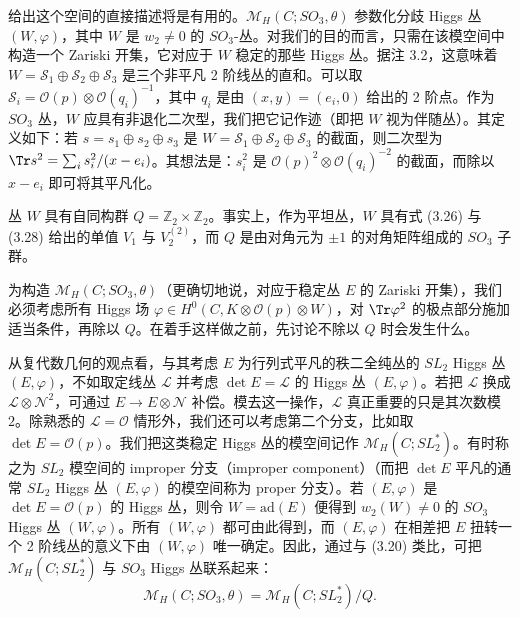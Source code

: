 给出这个空间的直接描述将是有用的。$\mathcal{M}_H(C;SO_3,\theta)$ 参数化分歧 Higgs 丛 $(W,\varphi)$，其中 $W$ 是 $w_2\ne0$ 的 $SO_3$-丛。对我们的目的而言，只需在该模空间中构造一个 Zariski 开集，它对应于 $W$ 稳定的那些 Higgs 丛。据注 3.2，这意味着 $W=\mathcal{S}_1\oplus\mathcal{S}_2\oplus\mathcal{S}_3$ 是三个非平凡 2 阶线丛的直和。可以取 $\mathcal{S}_i=\mathcal{O}(p)\otimes\mathcal{O}(q_i)^{-1}$，其中 $q_i$ 是由 $(x,y)=(e_i,0)$ 给出的 2 阶点。作为 $SO_3$ 丛，$W$ 应具有非退化二次型，我们把它记作迹（即把 $W$ 视为伴随丛）。其定义如下：若 $s=s_1\oplus s_2\oplus s_3$ 是 $W=\mathcal{S}_1\oplus\mathcal{S}_2\oplus\mathcal{S}_3$ 的截面，则二次型为 $\Tr s^2=\sum_i s_i^2/(x-e_i)$。其想法是：$s_i^2$ 是 $\mathcal{O}(p)^2\otimes\mathcal{O}(q_i)^{-2}$ 的截面，而除以 $x-e_i$ 即可将其平凡化。

丛 $W$ 具有自同构群 $Q=\mathbb{Z}_2\times\mathbb{Z}_2$。事实上，作为平坦丛，$W$ 具有式 (3.26) 与 (3.28) 给出的单值 $V_1$ 与 $V_2^{(2)}$，而 $Q$ 是由对角元为 $\pm1$ 的对角矩阵组成的 $SO_3$ 子群。

为构造 $\mathcal{M}_H(C;SO_3,\theta)$（更确切地说，对应于稳定丛 $E$ 的 Zariski 开集），我们必须考虑所有 Higgs 场 $\varphi\in H^0(C,K\otimes\mathcal{O}(p)\otimes W)$，对 $\Tr\varphi^2$ 的极点部分施加适当条件，再除以 $Q$。在着手这样做之前，先讨论不除以 $Q$ 时会发生什么。

从复代数几何的观点看，与其考虑 $E$ 为行列式平凡的秩二全纯丛的 $SL_2$ Higgs 丛 $(E,\varphi)$，不如取定线丛 $\mathcal{L}$ 并考虑 $\det E=\mathcal{L}$ 的 Higgs 丛 $(E,\varphi)$。若把 $\mathcal{L}$ 换成 $\mathcal{L}\otimes\mathcal{N}^2$，可通过 $E\to E\otimes\mathcal{N}$ 补偿。模去这一操作，$\mathcal{L}$ 真正重要的只是其次数模 $2$。除熟悉的 $\mathcal{L}=\mathcal{O}$ 情形外，我们还可以考虑第二个分支，比如取 $\det E=\mathcal{O}(p)$。我们把这类稳定 Higgs 丛的模空间记作 $\mathcal{M}_H(C;SL_2^*)$。有时称之为 $SL_2$ 模空间的 improper 分支（improper component）（而把 $\det E$ 平凡的通常 $SL_2$ Higgs 丛 $(E,\varphi)$ 的模空间称为 proper 分支）。若 $(E,\varphi)$ 是 $\det E=\mathcal{O}(p)$ 的 Higgs 丛，则令 $W=\mathrm{ad}(E)$ 便得到 $w_2(W)\ne0$ 的 $SO_3$ Higgs 丛 $(W,\varphi)$。所有 $(W,\varphi)$ 都可由此得到，而 $(E,\varphi)$ 在相差把 $E$ 扭转一个 2 阶线丛的意义下由 $(W,\varphi)$ 唯一确定。因此，通过与 (3.20) 类比，可把 $\mathcal{M}_H(C;SL_2^*)$ 与 $SO_3$ Higgs 丛联系起来：
\begin{equation}\tag{3.30}
\mathcal{M}_H(C;SO_3,\theta)=\mathcal{M}_H(C;SL_2^*)/Q.
\end{equation}

